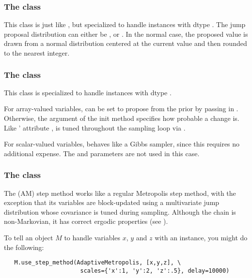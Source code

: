 \subsubsection[The DiscreteMetropolis class]{The
 class}
This class is just like , but specialized to handle
 instances with dtype . The jump proposal
distribution can either be ,  or . In the
normal case, the proposed value is drawn from a normal distribution
centered at the current value and then rounded to the
nearest integer.

\subsubsection[The BinaryMetropolis class]{The
 class}
This class is specialized to handle  instances with dtype .

For array-valued variables,  can be set to propose from the prior by passing in . Otherwise, the argument  of the init method specifies how probable a change is. Like ' attribute ,  is tuned throughout the sampling loop via .

For scalar-valued variables,  behaves like a Gibbs sampler, since this requires no additional expense. The  and  parameters are not used in this case.

\subsubsection[The AdaptiveMetropolis class]{The
 class}
\label{subsec:AM}
The  (AM) step method works like a regular Metropolis step method, with the exception that its variables are block-updated using a multivariate jump distribution whose covariance is tuned during sampling. Although the chain is non-Markovian, it has correct ergodic properties (see \cite{Haario:2001lr}).

To tell an  object $M$ to handle variables $x$, $y$ and $z$ with an  instance, you might do the following:
\begin{verbatim}
   M.use_step_method(AdaptiveMetropolis, [x,y,z], \
                      scales={'x':1, 'y':2, 'z':.5}, delay=10000)
\end{verbatim}

